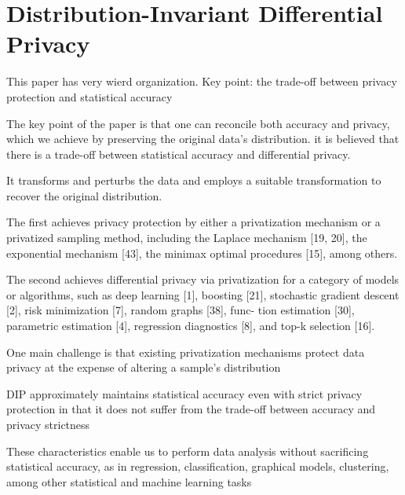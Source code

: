 
\chapter{Distribution-Invariant Differential Privacy}

This paper has very wierd organization.
Key point: the trade-off between privacy protection and statistical accuracy


The key point of the paper is  that one can reconcile both accuracy and privacy, which we achieve by preserving the original data’s distribution.
it is believed
that there is a trade-off between statistical accuracy and differential privacy.


It transforms and perturbs the data and employs a suitable transformation to recover the original distribution.

The first achieves privacy protection by either a privatization mechanism or a privatized sampling method, including the Laplace mechanism [19, 20], the exponential mechanism [43], the minimax optimal procedures [15], among others.

The second achieves differential privacy via privatization for a category of models or algorithms, such as deep learning [1], boosting [21], stochastic gradient descent [2], risk minimization [7], random graphs [38], func- tion estimation [30], parametric estimation [4], regression diagnostics [8], and top-k selection [16].

One main challenge is that existing privatization mechanisms protect data privacy at the expense
of altering a sample’s distribution

DIP approximately maintains statistical accuracy even with strict privacy protection in that it does not suffer from the trade-off between accuracy and privacy strictness


These characteristics enable us to perform data analysis without sacrificing statistical accuracy, as in regression, classification, graphical models, clustering, among other statistical and machine learning tasks


